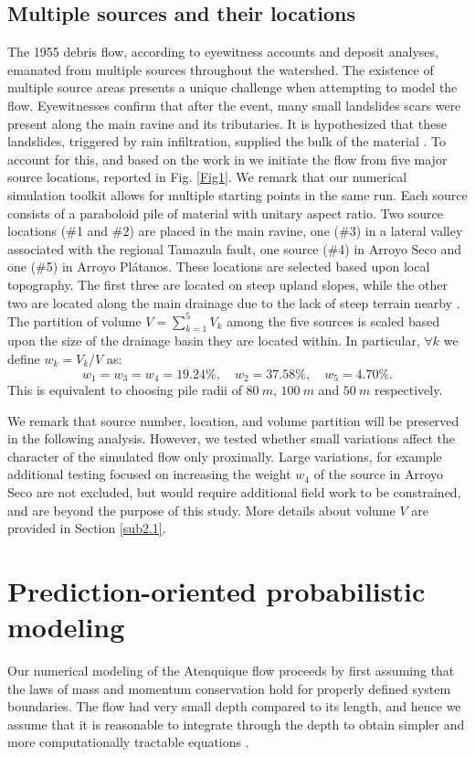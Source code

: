 \documentclass[nhess, manuscript]{copernicus}
\begin{document}
\subsection{Multiple sources and their locations}
The 1955 debris flow, according to eyewitness accounts and deposit analyses, emanated from multiple sources throughout the watershed. The existence of multiple source areas presents a unique challenge when attempting to model the flow. Eyewitnesses confirm that after the event, many small landslides scars were present along the main ravine and its tributaries. It is hypothesized that these landslides, triggered by rain infiltration, supplied the bulk of the material \citep{Saucedo2003, Saucedo2008}. To account for this, and based on the work in \cite{Rupp2004} we initiate the flow from five major source locations, reported in Fig. \ref{Fig1}. We remark that our numerical simulation toolkit allows for multiple starting points in the same run. Each source consists of a paraboloid pile of material with unitary aspect ratio. Two source locations (\#1 and \#2) are placed in the main ravine, one (\#3) in a lateral valley associated with the regional Tamazula fault, one source (\#4) in Arroyo Seco and one (\#5) in Arroyo Pl\'atanos. These locations are selected based upon local topography. The first three are located on steep upland slopes, while the other two are located along the main drainage due to the lack of steep terrain nearby \citep{Rupp2004}. The partition of volume $V=\sum^5_{k=1} V_k$ among the five sources is scaled based upon the size of the drainage basin they are located within. In particular, $\forall k$ we define $w_k=V_k/V$ as:
$$w_1=w_3=w_4=19.24\%, \quad w_2=37.58\%, \quad w_5=4.70\%.$$
This is equivalent to choosing pile radii of $80\ m$, $100\ m$ and $50\ m$ respectively.

We remark that source number, location, and volume partition will be preserved in the following analysis. However, we tested whether small variations affect the character of the simulated flow only proximally. Large variations, for example additional testing focused on increasing the weight $w_4$ of the source in Arroyo Seco are not excluded, but would require additional field work to be constrained, and are beyond the purpose of this study. More details about volume $V$ are provided in Section \ref{sub2.1}.

\section{Prediction-oriented probabilistic modeling}\label{s2}
Our numerical modeling of the Atenquique flow proceeds by first assuming that the laws of mass and momentum conservation hold for properly defined system boundaries. The flow had very small depth compared to its length, and hence we assume that it is reasonable to integrate through the depth to obtain simpler and more computationally tractable equations \citep{SavageHutter1989}. 
\end{document}
